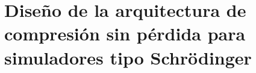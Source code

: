 \section{Diseño de la arquitectura de compresión sin pérdida para simuladores tipo Schrödinger}
\label{sec:simulation-design}








